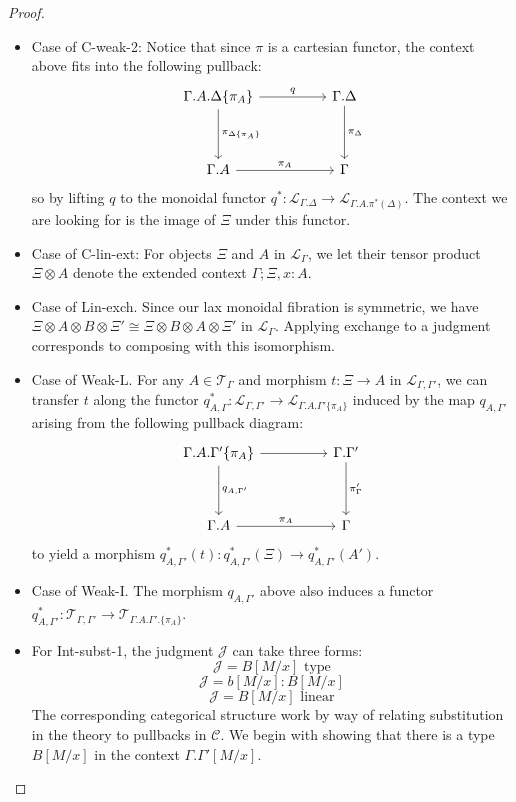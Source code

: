 \begin{thm}
\begin{proof}
\begin{itemize}
\item Case of C-weak-2: Notice that since $\pi$ is a cartesian functor, the context above fits into the following pullback:
\[
\ti
\Gamma.A.\Delta\{\pi_A\} \ar[r, "q"] \ar[d, "\pi_{\Delta\{\pi_A\}}"]  & \Gamma.\Delta \ar[d, "\pi_\Delta"]\\
\Gamma.A \ar[r, "\pi_A"] & \Gamma
\kz
\]
so by lifting $q$ to the monoidal functor $q^* : \mathcal{L}_{\Gamma.\Delta} \to \mathcal{L}_{\Gamma.A.\pi^*(\Delta)}$. The context we are looking for is the image of $\Xi$ under this functor.
\item Case of C-lin-ext: For objects $\Xi$ and $A$ in $\mathcal{L}_{\Gamma}$, we let their tensor product $\Xi \otimes A$ denote the extended context $\Gamma; \Xi, x : A$.
\item Case of Lin-exch. Since our lax monoidal fibration is symmetric, we have $\Xi \otimes A \otimes B \otimes \Xi' \cong \Xi \otimes B \otimes A \otimes \Xi'$ in $\mathcal{L}_{\Gamma}$. Applying exchange to a judgment corresponds to composing with this isomorphism.
\item Case of Weak-L. For any $A \in \mathcal{T}_{\Gamma}$ and morphism $t : \Xi \to A$ in $\mathcal{L}_{\Gamma, \Gamma'}$, we can transfer $t$ along the functor $q_{A, \Gamma}^* : \mathcal{L}_{\Gamma, \Gamma'} \to \mathcal{L}_{\Gamma.A.\Gamma'\{\pi_A\}}$ induced by the map $q_{A, \Gamma'}$ arising from the following pullback diagram:
\[
\ti
\Gamma.A.\Gamma'\{\pi_A\} \ar[r] \ar[d, "q_{A, \Gamma'}"]  & \Gamma.\Gamma' \ar[d, "\pi_\Gamma'"]\\
\Gamma.A \ar[r, "\pi_A"] & \Gamma
\kz
\]
to yield a morphism $q_{A, \Gamma'}^*(t) : q_{A, \Gamma'}^*(\Xi) \to q_{A, \Gamma'}^*(A')$.
\item Case of Weak-I. The morphism $q_{A, \Gamma'}$ above also induces a functor $q_{A, \Gamma'}^* : \mathcal{T}_{\Gamma, \Gamma'} \to \mathcal{T}_{\Gamma.A.\Gamma'.\{\pi_A\}}$.
\item For Int-subst-1, the judgment $\mathcal{J}$ can take three forms:
\[
\mathcal{J} = B[M/x] \text{ type}
\]
\[
\mathcal{J} = b[M/x] : B[M/x]
\]
\[
\mathcal{J} = B[M/x] \text{ linear}
\]
The corresponding categorical structure work by way of relating substitution in the theory to pullbacks in $\mathcal{C}$. We begin with showing that there is a type $B[M/x]$ in the context $\Gamma. \Gamma'[M/x]$.



\end{itemize}
\end{proof}
\end{thm}
